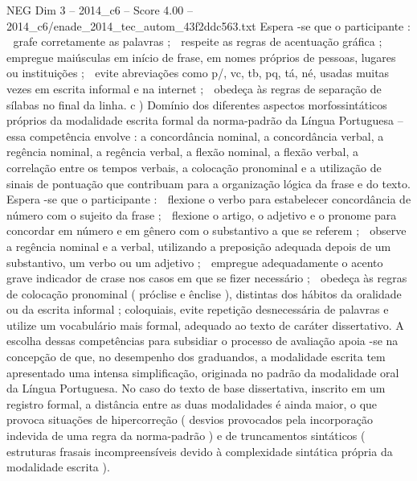 \begin{textsample}{NEG Dim 3 – 2014\_c6 – Score 4.00 – 2014\_c6/enade\_2014\_tec\_autom\_43f2ddc563.txt}
Espera -se que o participante :  grafe corretamente as palavras ;  respeite as regras de acentuação gráfica ;  empregue maiúsculas em início de frase, em nomes próprios de pessoas, lugares ou instituições ;  evite abreviações como p/, vc, tb, pq, tá, né, usadas muitas vezes em escrita informal e na internet ;  obedeça às regras de separação de sílabas no final da linha. c ) Domínio dos diferentes aspectos morfossintáticos próprios da modalidade escrita formal da norma-padrão da Língua Portuguesa – essa competência envolve : a concordância nominal, a concordância verbal, a regência nominal, a regência verbal, a flexão nominal, a flexão verbal, a correlação entre os tempos verbais, a colocação pronominal e a utilização de sinais de pontuação que contribuam para a organização lógica da frase e do texto.
Espera -se que o participante :  flexione o verbo para estabelecer concordância de número com o sujeito da frase ;  flexione o artigo, o adjetivo e o pronome para concordar em número e em gênero com o substantivo a que se referem ;  observe a regência nominal e a verbal, utilizando a preposição adequada depois de um substantivo, um verbo ou um adjetivo ;  empregue adequadamente o acento grave indicador de crase nos casos em que se fizer necessário ;  obedeça às regras de colocação pronominal ( próclise e ênclise ), distintas dos hábitos da oralidade ou da escrita informal ; coloquiais, evite repetição desnecessária de palavras e utilize um vocabulário mais formal, adequado ao texto de caráter dissertativo.
A escolha dessas competências para subsidiar o processo de avaliação apoia -se na concepção de que, no desempenho dos graduandos, a modalidade escrita tem apresentado uma intensa simplificação, originada no padrão da modalidade oral da Língua Portuguesa.
No caso do texto de base dissertativa, inscrito em um registro formal, a distância entre as duas modalidades é ainda maior, o que provoca situações de hipercorreção ( desvios provocados pela incorporação indevida de uma regra da norma-padrão ) e de truncamentos sintáticos ( estruturas frasais incompreensíveis devido à complexidade sintática própria da modalidade escrita ).

\end{textsample}

